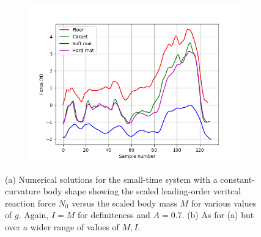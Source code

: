 \documentclass[USenglish]{ifimaster}  %
\begin{document}
	\begin{figure}[h] \ContinuedFloat
	\begin{subfigure}[b]{0.95\textwidth}
		\includegraphics[width=\textwidth,height=\textheight,keepaspectratio]{Figures/meanz}
		\caption{}
		\label{fig:meanz}
	\end{subfigure}
	
	\caption[Two numerical solutions]{(a) Numerical solutions for the small-time system 
		with a constant-curvature body shape showing the scaled leading-order veritcal 
		reaction force $N_0$ versus the scaled body mass $M$ for various values of $g$. 
		Again, $I=M$ for definiteness and $A=0.7$. (b) As for (a) but over a wider range of 
		values of $M,I$.}
	\label{fig:meanxyz}
\end{figure}
\end{document}

